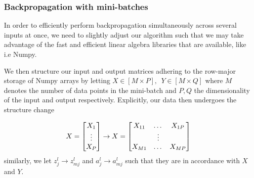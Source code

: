 \documentclass[reprint, english, nofootinbib]{revtex4-2}
\begin{document}
\subsubsection{Backpropagation with mini-batches}
\noindent
In order to efficiently perform backpropagation simultaneously across several inputs at once, we need to slightly adjust our algorithm such that we may take advantage of the fast and efficient linear algebra libraries that are available, like i.e Numpy.

We then structure our input and output matrices adhering to the row-major storage of Numpy arrays by letting $X\in[M\times P], \enspace Y\in[M\times Q]$ where $M$ denotes the number of data points in the mini-batch and $P, Q$ the dimensionality of the input and output respectively. Explicitly, our data then undergoes the structure change

\begin{equation}
    X = \qty[
    \begin{matrix}
        X_1 \\ \vdots \\ X_P
    \end{matrix}
    ] \rightarrow
    X = \qty[
    \begin{matrix}
        X_{11} & \dots & X_{1P} \\
                 & \vdots&          \\
        X_{M1} & \dots & X_{MP}
    \end{matrix}
    ]
\end{equation}
similarly, we let $z^l_j \rightarrow z^l_{mj}$ and $a^l_{j}\rightarrow a^l_{mj}$ such that they are in accordance with $X$ and $Y$.
\end{document}
